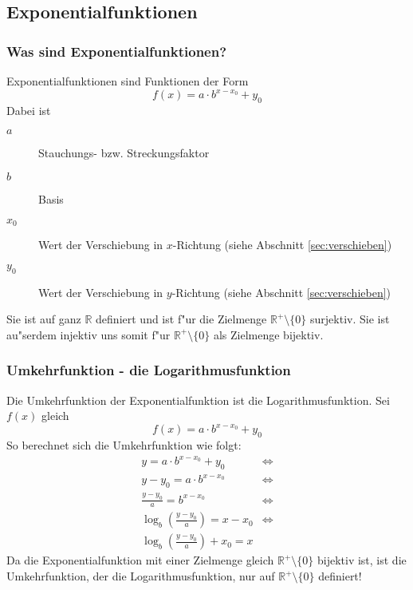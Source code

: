 \subsection{Exponentialfunktionen}
\subsubsection{Was sind Exponentialfunktionen?}
Exponentialfunktionen sind Funktionen der Form 
\begin{equation*}
f(x)=a \cdot b^{x-x_0}+y_0
\end{equation*}
Dabei ist
\begin{description}
\item[$a$] Stauchungs- bzw. Streckungsfaktor
\item[$b$] Basis
\item[$x_0$] Wert der Verschiebung in $x$-Richtung (siehe Abschnitt \ref{sec:verschieben})
\item[$y_0$] Wert der Verschiebung in $y$-Richtung (siehe Abschnitt \ref{sec:verschieben})
\end{description}
Sie ist auf ganz $\mathbb{R}$ definiert und ist f"ur die Zielmenge $\mathbb{R}^{+} \setminus \{0\}$ surjektiv. Sie ist au"serdem injektiv uns somit f"ur $\mathbb{R}^{+} \setminus \{0\}$ als Zielmenge bijektiv.

\subsubsection{Umkehrfunktion - die Logarithmusfunktion}
Die Umkehrfunktion der Exponentialfunktion ist die Logarithmusfunktion. Sei $f(x)$ gleich
\begin{equation*}
f(x) = a \cdot b^{x-x_0}+y_0
\end{equation*}
So berechnet sich die Umkehrfunktion wie folgt:
\begin{align*}
y = a \cdot b^{x-x_0}+y_0 &\iff  \\
y - y_0 = a \cdot b^{x-x_0} &\iff \\
\frac{y - y_0}{a} =  b^{x-x_0} &\iff \\
\log_b\left(\frac{y - y_0}{a}\right) = x - x_0 &\iff \\
\log_b\left(\frac{y - y_0}{a}\right) + x_0 = x &
\end{align*}
Da die Exponentialfunktion mit einer Zielmenge gleich $\mathbb{R}^{+} \setminus \{0\}$ bijektiv ist, ist die Umkehrfunktion, der die Logarithmusfunktion, nur auf $\mathbb{R}^{+} \setminus \{0\}$ definiert!